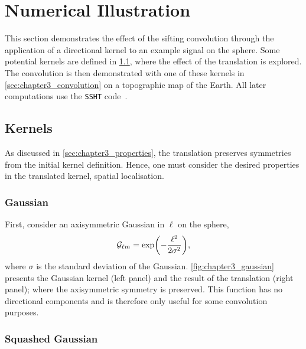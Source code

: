 \section{Numerical Illustration}\label{sec:chapter3_numerical_illustration}

This section demonstrates the effect of the sifting convolution through the application of a directional kernel to an example signal on the sphere.
Some potential kernels are defined in \cref{sec:chapter3_kernels}, where the effect of the translation is explored.
The convolution is then demonstrated with one of these kernels in \cref{sec:chapter3_convolution} on a topographic map of the Earth.
All later computations use the \texttt{SSHT} code~\cite{McEwen2011}.

\subsection{Kernels}\label{sec:chapter3_kernels}

As discussed in \cref{sec:chapter3_properties}, the translation preserves symmetries from the initial kernel definition.
Hence, one must consider the desired properties in the translated kernel, \eg{} spatial localisation.

\subsubsection{Gaussian}

First, consider an axisymmetric Gaussian in \(\ell{}\) on the sphere, \ie{}
%
\begin{equation}\label{eq:chapter3_gaussian}
	{\mathcal{G}}_{\ell m}
	= \exp(-\frac{{\ell}^{2}}{2\sigma^{2}}),
\end{equation}
%
where \(\sigma{}\) is the standard deviation of the Gaussian.
\cref{fig:chapter3_gaussian} presents the Gaussian kernel (left panel) and the result of the translation (right panel); where the axisymmetric symmetry is preserved.
This function has no directional components and is therefore only useful for some convolution purposes.



\subsubsection{Squashed Gaussian}

